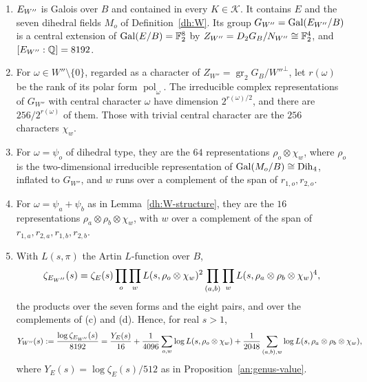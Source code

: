 \begin{lemma}\label{dh:EW}
\begin{enumerate}
\item[(a)] $E_{W''}$ is Galois over $B$ and contained in every $K\in\mathcal K$.
 It contains $E$ and the seven dihedral fields $M_o$ of
 Definition~\ref{dh:W}. Its group $G_{W''}=\operatorname{Gal}(E_{W''}/B)$ is a central
 extension of $\operatorname{Gal}(E/B)=\mathbb F_2^8$ by $Z_{W''}=D_2G_B/N_{W''}\cong\mathbb F_2^4$, and
 $[E_{W''}:\mathbb Q]=8192$.
\item[(b)] For $\omega\in W''\setminus\{0\}$, regarded as a character of
 $Z_{W''}=\operatorname{gr}_2G_B/W''^\perp$, let $r(\omega)$ be the rank of
 its polar form $\operatorname{pol}_\omega$. The irreducible complex
 representations of $G_{W''}$ with central character $\omega$ have dimension
 $2^{r(\omega)/2}$, and there are $256/2^{r(\omega)}$ of them. Those with
 trivial central character are the $256$ characters $\chi_w$.
\item[(c)] For $\omega=\psi_o$ of dihedral type, they are the $64$
 representations $\rho_o\otimes\chi_w$, where $\rho_o$ is the
 two-dimensional irreducible representation of
 $\operatorname{Gal}(M_o/B)\cong\mathrm{Dih}_4$, inflated to $G_{W''}$, and $w$ runs over a
 complement of the span of $r_{1,o},r_{2,o}$.
\item[(d)] For $\omega=\psi_a+\psi_b$ as in Lemma~\ref{dh:W-structure}, they
 are the $16$ representations $\rho_a\otimes\rho_b\otimes\chi_w$, with $w$
 over a complement of the span of $r_{1,a},r_{2,a},r_{1,b},r_{2,b}$.
\item[(e)] With $L(s,\pi)$ the Artin $L$-function over $B$,
 \[
  \zeta_{E_{W''}}(s)=\zeta_E(s)\prod_{o}\prod_{w}L(s,\rho_o\otimes\chi_w)^2
  \prod_{(a,b)}\prod_{w}L(s,\rho_a\otimes\rho_b\otimes\chi_w)^4,
 \]
 the products over the seven forms and the eight pairs, and over the
 complements of (c) and (d). Hence, for real $s>1$,
 \begin{equation}\label{dh:YW}
  Y_{W''}(s):=\frac{\log\zeta_{E_{W''}}(s)}{8192}
  =\frac{Y_E(s)}{16}+\frac1{4096}\sum_{o,w}\log L(s,\rho_o\otimes\chi_w)
  +\frac1{2048}\sum_{(a,b),w}\log L(s,\rho_a\otimes\rho_b\otimes\chi_w),
 \end{equation}
 where $Y_E(s)=\log\zeta_E(s)/512$ as in Proposition~\ref{an:genus-value}.
\end{enumerate}
\end{lemma}

